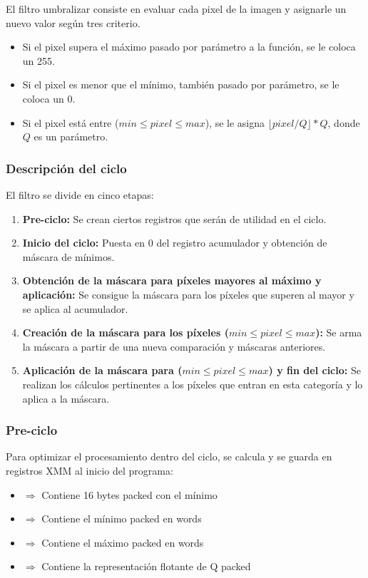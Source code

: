 El filtro umbralizar consiste en evaluar cada pixel de la imagen y asignarle un nuevo valor según tres criterio.

\begin{itemize}
\item Si el pixel supera el máximo pasado por parámetro a la función, se le coloca un 255.
\item Si el pixel es menor que el mínimo, también pasado por parámetro, se le coloca un 0.
\item Si el pixel está entre ($min \leq pixel \leq max$), se le asigna $\lfloor pixel/Q \rfloor * Q$, donde $Q$ es un parámetro.
\end{itemize}


\subsubsection{Descripción del ciclo}

El filtro se divide en cinco etapas:

\begin{enumerate}
\item \textbf{Pre-ciclo:} Se crean ciertos registros que serán de utilidad en el ciclo.
\item \textbf{Inicio del ciclo:} Puesta en 0 del registro acumulador y obtención de máscara de mínimos.
\item \textbf{Obtención de la máscara para píxeles mayores al máximo y aplicación:} Se consigue la máscara para los píxeles que superen al mayor y se aplica al acumulador.
\item \textbf{Creación de la máscara para los píxeles ($min \leq pixel \leq max$):} Se arma la máscara a partir de una nueva comparación y máscaras anteriores.
\item \textbf{Aplicación de la máscara para ($min \leq pixel \leq max$) y fin del ciclo:} Se realizan los cálculos pertinentes a los píxeles que entran en esta categoría y lo aplica a la máscara.
\end{enumerate}


\subsubsection{Pre-ciclo}

Para optimizar el procesamiento dentro del ciclo, se calcula y se guarda en registros XMM al inicio del programa:
\begin{itemize}
  \item {} $\Rightarrow$ Contiene 16 bytes packed con el mínimo
  \item {} $\Rightarrow$ Contiene el mínimo packed en words
  \item {} $\Rightarrow$ Contiene el máximo packed en words
  \item {} $\Rightarrow$ Contiene la representación flotante de Q packed
\end{itemize}

